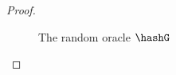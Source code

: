 \begin{proof}
\begin{itemize}
		

		\begin{figure}
			\begin{minipage}{.4\textwidth}

				\centering
				\noindent{}	
				\caption{The random oracle $ \hashG $}
				\label{oracle:HgnoPK}

			\end{minipage}%
			\begin{minipage}{0.6\textwidth}
				\centering
				\scriptsize
				\noindent{}
\end{minipage}
\end{figure}
\end{itemize}
\end{proof}
